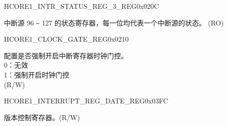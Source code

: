 \begin{register}{H}{CORE1\_INTR\_STATUS\_REG\_3\_REG}{0x020C}\label{regdesc:CORE1INTRSTATUSREG3REG}
%
\regnewline%
\begin{regdesc}\begin{reglist}
\label{fielddesc:CORE1CORE1INTRSTATUS3}\item [CORE1\_INTR\_STATUS\_3] 中断源 96 \verb+~+ 127 的状态寄存器，每一位均代表一个中断源的状态。 (RO)
\end{reglist}\end{regdesc}
\end{register}


\begin{register}{H}{CORE1\_CLOCK\_GATE\_REG}{0x0210}\label{regdesc:CORE1CLOCKGATEREG}
%
%
\regnewline%
\begin{regdesc}\begin{reglist}
\label{fielddesc:CORE1CORE1REGCLKEN}\item [CORE1\_REG\_CLK\_EN] 配置是否强制开启中断寄存器时钟门控。\\
0：无效 \\
1：强制开启时钟门控 \\
(R/W)
\end{reglist}\end{regdesc}
\end{register}


\begin{register}{H}{CORE1\_INTERRUPT\_REG\_DATE\_REG}{0x03FC}\label{regdesc:CORE1INTERRUPTREGDATEREG}
%
%
\regnewline%
\begin{regdesc}\begin{reglist}
\label{fielddesc:CORE1CORE1INTERRUPTREGDATE}\item [CORE1\_INTERRUPT\_REG\_DATE] 版本控制寄存器。(R/W)
\end{reglist}\end{regdesc}
\end{register}


